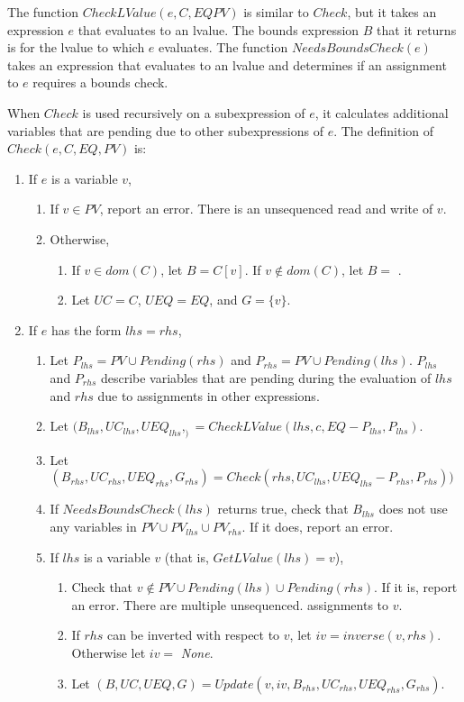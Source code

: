 The function $CheckLValue(e, C, EQ PV)$ is similar to $Check$, but it takes an
expression $e$ that evaluates to an lvalue.  The bounds expression $B$ that it 
returns is for the lvalue to which $e$ evaluates.  The function $NeedsBoundsCheck(e)$ takes
an expression that evaluates to an lvalue and determines if an 
assignment to $e$ requires a bounds check.

When $Check$ is used recursively on a subexpression of $e$, it calculates 
additional variables that are pending due to other subexpressions of $e$.
The definition of $Check(e, C, EQ, PV)$ is:
\begin{enumerate}

\item If $e$ is a variable $v$,
\begin{enumerate}
\item If $v \in PV$, report an error.  There is an unsequenced read and write of $v$.
\item Otherwise,
\begin{enumerate} 
\item If $v \in dom(C)$, let $B = C[v]$.  If $v \notin dom(C)$, let $B =$ \boundsunknown.
\item Let $UC = C$, $UEQ = EQ$, and $G = \{ v \}$.
\end{enumerate}
\end{enumerate}

\item If $e$ has the form $lhs = rhs$,
\label{list:check-assignment}
\begin{enumerate}
\item Let $P_{lhs} = PV \cup Pending(rhs)$ and $P_{rhs} = PV \cup Pending(lhs).$   $P_{lhs}$
        and $P_{rhs}$  describe variables that are pending during the evaluation of $lhs$ and $rhs$ due
        to assignments in other expressions.
\item Let $(B_{lhs}, {UC}_{lhs}, {UEQ}_{lhs}, _) = CheckLValue(lhs, c, EQ - P_{lhs}, P_{lhs})$.  
\item Let $(B_{rhs}, {UC}_{rhs}, {UEQ}_{rhs}, G_{rhs}) = Check(rhs, {UC}_{lhs}, {UEQ}_{lhs} - P_{rhs},P_{rhs}))$ 
\item If $NeedsBoundsCheck(lhs)$ returns true, check that $B_{lhs}$ does not use any variables in 
$PV \cup PV_{lhs} \cup PV_{rhs}$.  If it does, report an error.
\item  If $lhs$ is a variable $v$ (that is, $GetLValue(lhs) = { v }$),
\begin{enumerate}
\item Check that $v \notin PV \cup Pending(lhs) \cup Pending(rhs)$.  If it is, report an error.  
There are multiple unsequenced. assignments to $v$.
\item If $rhs$ can be inverted with respect to $v$, let $iv = inverse(v, rhs)$.   Otherwise
let $iv = $ {\it None}.
\item Let $(B, UC, UEQ, G) = Update(v, iv, B_{rhs}, UC_{rhs}, UEQ_{rhs}, G_{rhs})$.
\end{enumerate}
\end{enumerate}


\end{enumerate}
